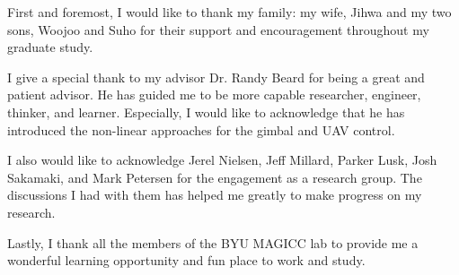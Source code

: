 \afterpage{\cleardoublepage}
%
First and foremost, I would like to thank my family: my wife, Jihwa and my two sons, Woojoo and Suho for their support and encouragement throughout my graduate study. 

I give a special thank to my advisor Dr. Randy Beard for being a great and patient advisor. He has guided me to be more capable researcher, engineer, thinker, and learner. Especially, I would like to acknowledge that he has introduced the non-linear approaches for the gimbal and UAV control. 

I also would like to acknowledge Jerel Nielsen, Jeff Millard, Parker Lusk, Josh Sakamaki, and Mark Petersen for the engagement as a research group. The discussions I had with them has helped me greatly to make progress on my research. 

Lastly, I thank all the members of the BYU MAGICC lab to provide me a wonderful learning opportunity and fun place to work and study. 
